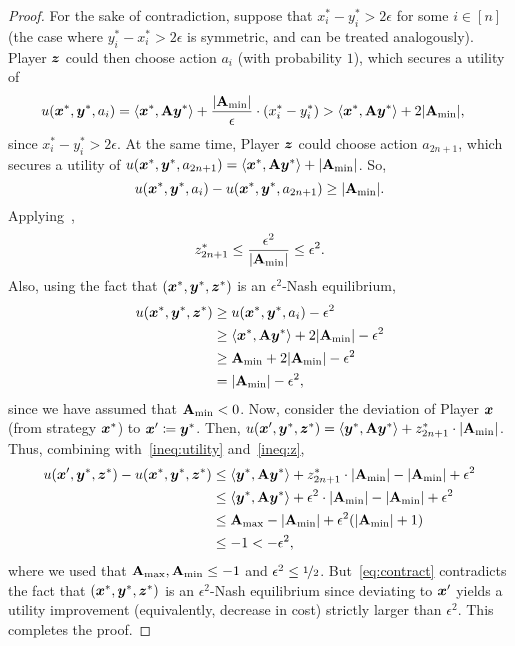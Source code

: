 \begin{proof}
    For the sake of contradiction, suppose that $x_i^* - y_i^* > 2 \epsilon$ for some $i \in [n]$ (the case where $y_i^* - x_i^* > 2 \epsilon$ is symmetric, and can be treated analogously). Player ${\bm{z}}$ could then choose action $a_i$ (with probability $1$), which secures a utility of
    \begin{align*}
        u({\bm{x}}^*, {\bm{y}}^*, a_i) 
        & = \langle {\bm{x}}^*, \mathbf{A} {\bm{y}}^* \rangle  + \frac{|\mathbf{A}_{\min}|}{\epsilon} \cdot (x^*_i - y^*_i) > \langle {\bm{x}}^*, \mathbf{A} {\bm{y}}^* \rangle + 2 |\mathbf{A}_{\min}|,
    \end{align*}
    since $x_i^* - y_i^* > 2 \epsilon$. At the same time, Player ${\bm{z}}$ could choose action $a_{2n+1}$, which secures a utility of $u({\bm{x}}^*, {\bm{y}}^*, a_{2n+1}) = \langle {\bm{x}}^*, \mathbf{A} {\bm{y}}^* \rangle + |\mathbf{A}_{\min}|$. So,
    \begin{equation*}
        u({\bm{x}}^*, {\bm{y}}^*, a_i) - u({\bm{x}}^*, {\bm{y}}^*, a_{2n+1}) \geq |\mathbf{A}_{\min}|.
    \end{equation*}
    Applying~,
    \begin{align}
        \label{ineq:z}
    z^*_{2n+1} \leq \frac{\epsilon^2}{|\mathbf{A}_{\min}|} \leq \epsilon^2.
    \end{align}
    Also, using the fact that $({\bm{x}}^*, {\bm{y}}^*, {\bm{z}}^*)$ is an $\epsilon^2$-Nash equilibrium,
    \begin{align}
    u({\bm{x}}^*,{\bm{y}}^*,{\bm{z}}^*) &\geq u({\bm{x}}^*,{\bm{y}}^*,a_i) - \epsilon^2 \notag \\
    &\geq \langle {\bm{x}}^*, \mathbf{A} {\bm{y}}^* \rangle + 2|\mathbf{A}_{\min}| -\epsilon^2 \notag \\
    &\geq \mathbf{A}_{\min} + 2|\mathbf{A}_{\min}|-\epsilon^2
    \notag \\
    &= |\mathbf{A}_{\min}| -\epsilon^2, \label{ineq:utility}
    \end{align}
    since we have assumed that $\mathbf{A}_{\min} < 0$. Now, consider the deviation of Player ${\bm{x}}$ (from strategy ${\bm{x}}^*$) to ${\bm{x}}' \coloneqq {\bm{y}}^*$. Then, $u({\bm{x}}', {\bm{y}}^*, {\bm{z}}^*) = \langle {\bm{y}}^*, \mathbf{A} {\bm{y}}^* \rangle + z^*_{2n+1} \cdot |\mathbf{A}_{\min}|$. Thus, combining with~\eqref{ineq:utility} and~\eqref{ineq:z},
    \begin{align}
        u({\bm{x}}', {\bm{y}}^*, {\bm{z}}^*) - u({\bm{x}}^*, {\bm{y}}^*, {\bm{z}}^*) & \leq \langle {\bm{y}}^*, \mathbf{A} {\bm{y}}^* \rangle  + z_{2n+1}^* \cdot |\mathbf{A}_{\min}| - |\mathbf{A}_{\min}| + \epsilon^2 \notag \\
        & \leq \langle {\bm{y}}^*, \mathbf{A} {\bm{y}}^* \rangle + \epsilon^2 \cdot |\mathbf{A}_{\min}| -  |\mathbf{A}_{\min} | + \epsilon^2 \notag \\
        & \leq \mathbf{A}_{\max} - |\mathbf{A}_{\min}| + \epsilon^2(|\mathbf{A}_{\min}|+1) \notag \\&\leq -1 < - \epsilon^2,  \label{eq:contract}
    \end{align}
    where we used that $\mathbf{A}_{\max}, \mathbf{A}_{\min} \leq -1$ and $\epsilon^2 \leq \nicefrac{1}{2}$. But~\eqref{eq:contract} contradicts the fact that $({\bm{x}}^*, {\bm{y}}^*, {\bm{z}}^*)$ is an $\epsilon^2$-Nash equilibrium since deviating to ${\bm{x}}'$ yields a utility improvement (equivalently, decrease in cost) strictly larger than $\epsilon^2$. This completes the proof.
\end{proof}

